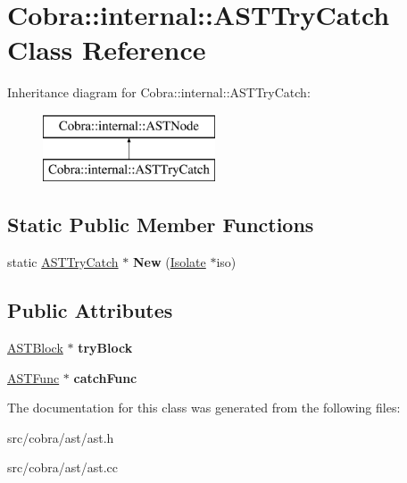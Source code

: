 \hypertarget{class_cobra_1_1internal_1_1_a_s_t_try_catch}{\section{Cobra\+:\+:internal\+:\+:A\+S\+T\+Try\+Catch Class Reference}
\label{class_cobra_1_1internal_1_1_a_s_t_try_catch}
}
Inheritance diagram for Cobra\+:\+:internal\+:\+:A\+S\+T\+Try\+Catch\+:\begin{figure}[H]
\begin{center}
\leavevmode
\includegraphics[height=2.000000cm]{class_cobra_1_1internal_1_1_a_s_t_try_catch}
\end{center}
\end{figure}
\subsection*{Static Public Member Functions}
\begin{DoxyCompactItemize}
\item 
\hypertarget{class_cobra_1_1internal_1_1_a_s_t_try_catch_aaeb61837ba816c39fc4369394842c0ce}{static \hyperlink{class_cobra_1_1internal_1_1_a_s_t_try_catch}{A\+S\+T\+Try\+Catch} $\ast$ {\bfseries New} (\hyperlink{class_cobra_1_1internal_1_1_isolate}{Isolate} $\ast$iso)}\label{class_cobra_1_1internal_1_1_a_s_t_try_catch_aaeb61837ba816c39fc4369394842c0ce}

\end{DoxyCompactItemize}
\subsection*{Public Attributes}
\begin{DoxyCompactItemize}
\item 
\hypertarget{class_cobra_1_1internal_1_1_a_s_t_try_catch_a07c89b2b01d7c3062eca3e38ba01c232}{\hyperlink{class_cobra_1_1internal_1_1_a_s_t_block}{A\+S\+T\+Block} $\ast$ {\bfseries try\+Block}}\label{class_cobra_1_1internal_1_1_a_s_t_try_catch_a07c89b2b01d7c3062eca3e38ba01c232}

\item 
\hypertarget{class_cobra_1_1internal_1_1_a_s_t_try_catch_aa1c1d6f5c72bae416cd96d33dced7b94}{\hyperlink{class_cobra_1_1internal_1_1_a_s_t_func}{A\+S\+T\+Func} $\ast$ {\bfseries catch\+Func}}\label{class_cobra_1_1internal_1_1_a_s_t_try_catch_aa1c1d6f5c72bae416cd96d33dced7b94}

\end{DoxyCompactItemize}


The documentation for this class was generated from the following files\+:\begin{DoxyCompactItemize}
\item 
src/cobra/ast/ast.\+h\item 
src/cobra/ast/ast.\+cc\end{DoxyCompactItemize}
